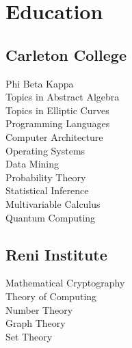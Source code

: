 \documentclass{resume}
\begin{document}

%
%

\begin{minipage}[t]{0.33\textwidth}


\section{Education}

\subsection{Carleton College}
Phi Beta Kappa \\
{}
Topics in Abstract Algebra \\
Topics in Elliptic Curves \\
Programming Languages \\
Computer Architecture \\
Operating Systems \\
Data Mining \\
Probability Theory \\
Statistical Inference \\
Multivariable Calculus \\
Quantum Computing \\
\sectionsep

\subsection{Reni Institute}
{}
Mathematical Cryptography \\
Theory of Computing \\
Number Theory \\
Graph Theory \\
Set Theory \\
\sectionsep



\end{minipage}
\end{document}
